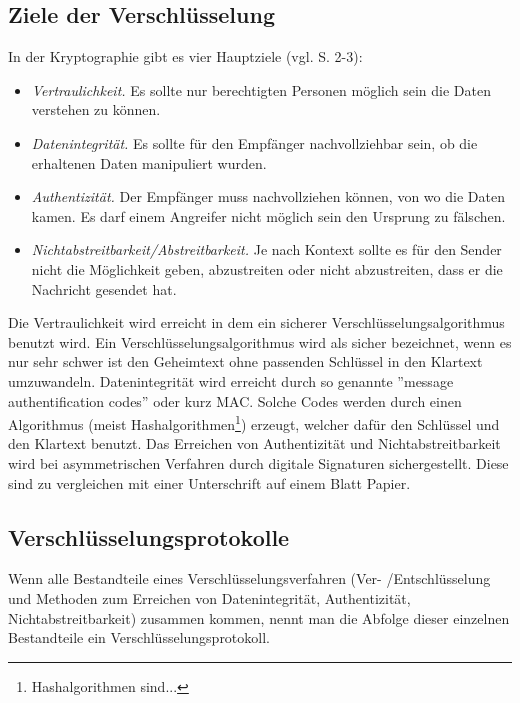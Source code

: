 \documentclass[a4paper,12pt,titlepage]{article}
\begin{document}
\subsection{Ziele der Verschlüsselung}
In der Kryptographie gibt es vier Hauptziele (vgl. \cite{delfs_knebl} S. 2-3):

\begin{itemize}
\item \textit{Vertraulichkeit.} Es sollte nur berechtigten Personen möglich sein die Daten verstehen zu können.

\item \textit{Datenintegrität.} Es sollte für den Empfänger nachvollziehbar sein, ob die erhaltenen Daten manipuliert wurden.

\item \textit{Authentizität.} Der Empfänger muss nachvollziehen können, von wo die Daten kamen. Es darf einem Angreifer nicht möglich sein den Ursprung zu fälschen.

\item \textit{Nichtabstreitbarkeit/Abstreitbarkeit.} Je nach Kontext sollte es für den Sender nicht die Möglichkeit geben, abzustreiten oder nicht abzustreiten, dass er die Nachricht gesendet hat.
\end{itemize} %
Die Vertraulichkeit wird erreicht in dem ein sicherer Verschlüsselungsalgorithmus benutzt wird. Ein Verschlüsselungsalgorithmus wird als sicher bezeichnet, wenn es nur sehr schwer ist den Geheimtext ohne passenden Schlüssel in den Klartext umzuwandeln. Datenintegrität wird erreicht durch so genannte ''message authentification codes'' oder kurz MAC. Solche Codes werden durch einen Algorithmus (meist Hashalgorithmen\footnote{Hashalgorithmen sind...}) erzeugt, welcher dafür den Schlüssel und den Klartext benutzt. Das Erreichen von Authentizität und Nichtabstreitbarkeit wird bei asymmetrischen Verfahren durch digitale Signaturen sichergestellt. Diese sind zu vergleichen mit einer Unterschrift auf einem Blatt Papier.

\subsection{Verschlüsselungsprotokolle}
Wenn alle Bestandteile eines Verschlüsselungsverfahren (Ver- /Entschlüsselung und Methoden zum Erreichen von Datenintegrität, Authentizität, Nichtabstreitbarkeit) zusammen kommen, nennt man die Abfolge dieser einzelnen Bestandteile ein Verschlüsselungsprotokoll.
\end{document}

